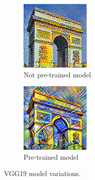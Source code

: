 \documentclass[twocolumn,superscriptaddress,aps, floatfix]{revtex4-1}
\begin{document}
    \begin{figure}[ht]
        \centering
        \begin{subfigure}[b]{0.22\textwidth}
            \centering
            \includegraphics[width=\textwidth]{resources/png/model/sun-trees-paris-notpretrained.png}
            \caption{Not pre-trained model}
        \end{subfigure}
        \hfill
        \begin{subfigure}[b]{0.22\textwidth}
            \centering
            \includegraphics[width=\textwidth]{resources/png/model/sun-trees-paris-pretrained.png}
            \caption{Pre-trained model}
        \end{subfigure}
        \caption{VGG19 model variations.}
        \label{fig:model.pretrained.variations}
    \end{figure}
    
\end{document}
